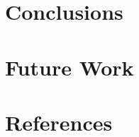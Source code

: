 \documentclass[xcolor=dvipsnames,dvip,notes=show,table]{beamer}
\begin{document}
\frame{


}




\section{Conclusions}

\frame{
\titlepage

}



\section{Future Work}

\frame{
\titlepage

}



\nocite{*}

\appendix
\section*{References}


% 
% 
% 
\end{document}
